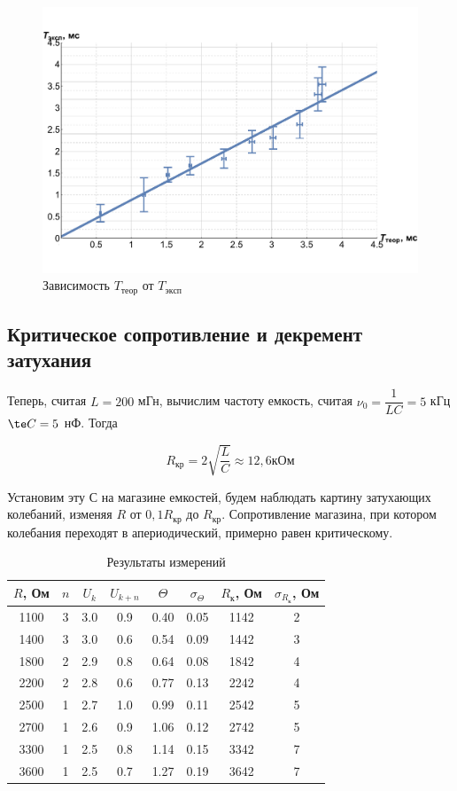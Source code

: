\documentclass[12pt]{kiarticle}
\begin{document}
\begin{figure}[h!]
	\includegraphics[scale=0.55]{T.pdf}
	\caption{Зависимость $ T_{теор}$ от $ T_{эксп} $}
\end{figure}

\subsection{Критическое сопротивление и декремент затухания}

Теперь, считая $ L = 200 $ мГн, вычислим  частоту емкость, считая $ \nu_0 = \dfrac{1}{LC} = 5 $ кГц $ \te C = 5  $ нФ. Тогда 
 
 \begin{equation}\label{}
 R_ {кр} = 2 \sqrt{\dfrac{L}{C}} \approx 12,6 кОм
 \end{equation}

Установим эту $ С $ на магазине емкостей, будем наблюдать картину затухающих колебаний, изменяя $ R $ от $ 0,1 R_{кр}$ до $ R_{кр} $. Сопротивление магазина, при котором колебания переходят в апериодический, примерно равен критическому. 

\begin{table}[h!]
	\centering
	\caption{Результаты измерений}
	\begin{tabular}{|c|c|c|c|c|c|c|c|}
		\hline
		$ R $, Ом & $ n $ & $ U_k$ & $ U_{k+n} $& $ \Theta $& $ \sigma_\Theta $ & $ R_к $, Ом & $ \sigma_{R_к} $, Ом \\
		\hline
		1100 & 3 & 3.0 & 0.9 & 0.40 & 0.05 & 1142 & 2 \\
		1400 & 3 & 3.0 & 0.6 & 0.54 & 0.09 & 1442 & 3 \\
		1800 & 2 & 2.9 & 0.8 & 0.64 & 0.08 & 1842 & 4 \\
		2200 & 2 & 2.8 & 0.6 & 0.77 & 0.13 & 2242 & 4 \\
		2500 & 1 & 2.7 & 1.0 & 0.99 & 0.11 & 2542 & 5 \\
		2700 & 1 & 2.6 & 0.9 & 1.06 & 0.12 & 2742 & 5 \\
		3300 & 1 & 2.5 & 0.8 & 1.14 & 0.15 & 3342 & 7 \\
		3600 & 1 & 2.5 & 0.7 & 1.27 & 0.19 & 3642 & 7 \\
		\hline
	\end{tabular}%
	\label{resR}%
\end{table}%
\end{document}
